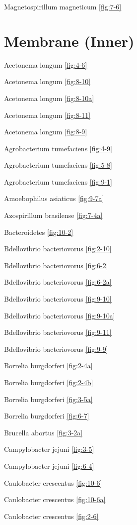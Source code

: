 \documentclass[]{tufte-book}
\begin{document}
Magnetospirillum magneticum \ref{fig:7-6}

\hypertarget{membrane-inner}{%
\section*{Membrane (Inner)}\label{membrane-inner}}

Acetonema longum \ref{fig:4-6}

Acetonema longum \ref{fig:8-10}

Acetonema longum \ref{fig:8-10a}

Acetonema longum \ref{fig:8-11}

Acetonema longum \ref{fig:8-9}

Agrobacterium tumefaciens \ref{fig:4-9}

Agrobacterium tumefaciens \ref{fig:5-8}

Agrobacterium tumefaciens \ref{fig:9-1}

Amoebophilus asiaticus \ref{fig:9-7a}

Azospirillum brasilense \ref{fig:7-4a}

Bacteroidetes \ref{fig:10-2}

Bdellovibrio bacteriovorus \ref{fig:2-10}

Bdellovibrio bacteriovorus \ref{fig:6-2}

Bdellovibrio bacteriovorus \ref{fig:6-2a}

Bdellovibrio bacteriovorus \ref{fig:9-10}

Bdellovibrio bacteriovorus \ref{fig:9-10a}

Bdellovibrio bacteriovorus \ref{fig:9-11}

Bdellovibrio bacteriovorus \ref{fig:9-9}

Borrelia burgdorferi \ref{fig:2-4a}

Borrelia burgdorferi \ref{fig:2-4b}

Borrelia burgdorferi \ref{fig:3-5a}

Borrelia burgdorferi \ref{fig:6-7}

Brucella abortus \ref{fig:3-2a}

Campylobacter jejuni \ref{fig:3-5}

Campylobacter jejuni \ref{fig:6-4}

Caulobacter crescentus \ref{fig:10-6}

Caulobacter crescentus \ref{fig:10-6a}

Caulobacter crescentus \ref{fig:2-6}
\end{document}
